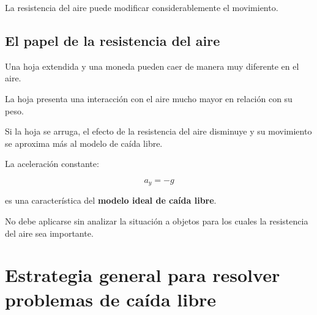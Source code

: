 La resistencia del aire puede modificar considerablemente el movimiento.


\subsection{El papel de la resistencia del aire}

Una hoja extendida y una moneda pueden caer de manera muy diferente en el aire.

La hoja presenta una interacción con el aire mucho mayor en relación con su peso.

Si la hoja se arruga, el efecto de la resistencia del aire disminuye y su movimiento se aproxima más al modelo de caída libre.

\begin{advertencia}
La aceleración constante:

\[ a_y=-g \]

es una característica del \textbf{modelo ideal de caída libre}.

No debe aplicarse sin analizar la situación a objetos para los cuales la resistencia del aire sea importante.
\end{advertencia}


\section{Estrategia general para resolver problemas de caída libre}

